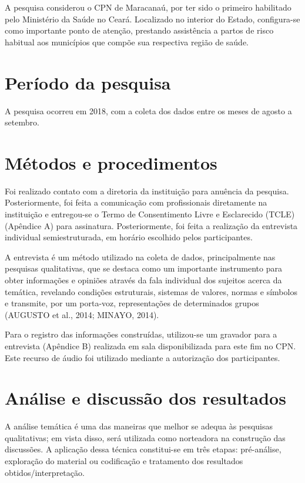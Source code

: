 A pesquisa considerou o CPN de Maracanaú, por ter sido o primeiro habilitado pelo Ministério da Saúde no Ceará. Localizado no interior do Estado, configura-se como importante ponto de atenção, prestando assistência a partos de risco habitual aos municípios que compõe sua respectiva região de saúde. 

\section{Período da pesquisa}

A pesquisa ocorreu em 2018, com a coleta dos dados entre os meses de agosto a setembro.

\section{Métodos e procedimentos}

Foi realizado contato com a diretoria da instituição para anuência da pesquisa. Posteriormente, foi feita a comunicação com profissionais diretamente na instituição e entregou-se o Termo de Consentimento Livre e Esclarecido (TCLE) (Apêndice A) para assinatura. Posteriormente, foi feita a realização da entrevista individual semiestruturada, em horário escolhido pelos participantes. 

A entrevista é um método utilizado na coleta de dados, principalmente nas pesquisas qualitativas, que se destaca como um importante instrumento para obter informações e opiniões através da fala individual dos sujeitos acerca da temática, revelando condições estruturais, sistemas de valores, normas e símbolos e transmite, por um porta-voz, representações de determinados grupos (AUGUSTO et al., 2014; MINAYO, 2014). 

Para o registro das informações construídas, utilizou-se um gravador para a entrevista (Apêndice B) realizada em sala disponibilizada para este fim no CPN. Este recurso de áudio foi utilizado mediante a autorização dos participantes.

\section{Análise e discussão dos resultados}

A análise temática é uma das maneiras que melhor se adequa às pesquisas qualitativas; em vista disso, será utilizada como norteadora na construção das discussões. A aplicação dessa técnica constitui-se em três etapas: pré-análise, exploração do material ou codificação e tratamento dos resultados obtidos/interpretação.

